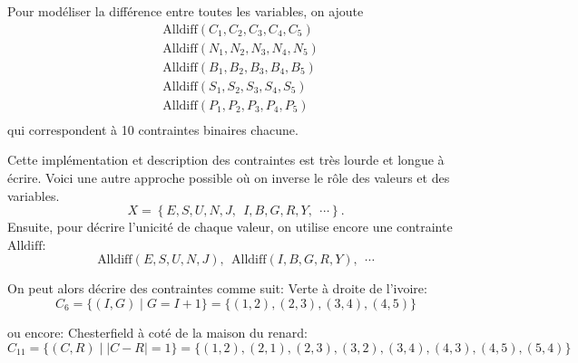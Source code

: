{\begin{td-sol}[]
        Pour modéliser la différence entre toutes les variables, on ajoute
        \begin{equation*}
            \begin{aligned}
                &\text{Alldiff}(C_1, C_2, C_3, C_4, C_5)\\
                &\text{Alldiff}(N_1, N_2, N_3, N_4, N_5)\\
                &\text{Alldiff}(B_1, B_2, B_3, B_4, B_5)\\
                &\text{Alldiff}(S_1, S_2, S_3, S_4, S_5)\\
                &\text{Alldiff}(P_1, P_2, P_3, P_4, P_5)\\
            \end{aligned}
        \end{equation*}
        qui correspondent à 10 contraintes binaires chacune.

        Cette implémentation et description des contraintes est très lourde
        et longue à écrire. Voici une autre approche possible où on inverse
        le rôle des valeurs et des variables. 
        \begin{equation*}
            X = \left\{E, S, U, N, J,\ \  I, B, G, R, Y,\ \ \cdots\right\}.
        \end{equation*}
        Ensuite, pour décrire l'unicité de chaque valeur, on utilise
        encore une contrainte \(\text{Alldiff}\):
        \begin{equation*}
            \text{Alldiff}(E, S, U, N, J),\ \ \text{Alldiff}(I, B, G, R, Y),\ \ \cdots
        \end{equation*}

        On peut alors décrire des contraintes comme suit: \og{}Verte à droite
        de l'ivoire\fg{}:
        \begin{equation*}
            C_6 = \{(I,G) \mid G = I + 1\} = \{(1,2), (2,3), (3,4), (4,5)\}
        \end{equation*}

        ou encore: \og{}Chesterfield à coté de la maison du renard\fg{}:
        \begin{equation*}
            C_{11} = \{(C, R) \mid |C - R| = 1\} = \{(1,2), (2,1), (2,3), (3,2), (3,4), (4,3), (4,5), (5,4)\}
        \end{equation*}

	\end{td-sol}
}{}
